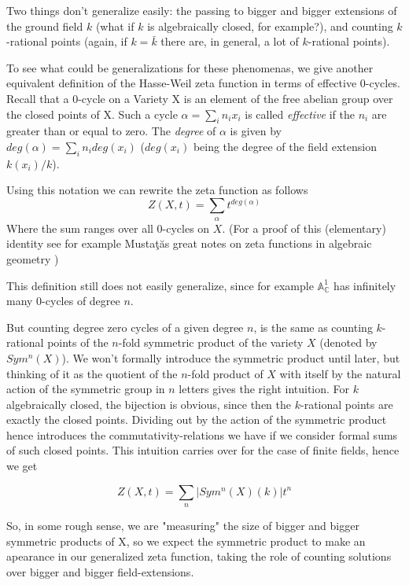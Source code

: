 \documentclass[11pt, a4paper, german]{article}
\theoremstyle{plain}
\theoremstyle{definition}
\begin{document}
Two things don't generalize easily: the passing to bigger and bigger extensions of the ground field $k$ (what if $k$ is algebraically closed,
for example?), and counting $k$-rational points (again, if $k = \bar{k}$ there are, in general, a lot of $k$-rational points). 

To see what could be generalizations for these phenomenas, 
we give another equivalent definition of the Hasse-Weil zeta function in terms of effective 0-cycles. 
Recall that a 0-cycle on a Variety X is an element of the free abelian group over the closed 
points of X. Such a cycle $\alpha = \sum_i n_i x_i$ is called \emph{effective} if the $n_i$ are greater than or equal to zero.
The \emph{degree} of $\alpha$ is given by $deg(\alpha) = \sum_i n_i deg(x_i)$ ($deg(x_i)$ being the degree of the field extension $k(x_i)/k$).

Using this notation we can rewrite the zeta function as follows 
\begin{equation}
    Z(X,t) = \sum_{\alpha} t^{deg(\alpha)}
\end{equation}
Where the sum ranges over all 0-cycles on $X$.
(For a proof of this (elementary) identity see for example Musta\c{t}\u{a}s great notes on zeta functions in algebraic geometry 
\cite[Remark 2.9]{mustata})

This definition still does not easily generalize, since for example $\mathbb{A}_{\mathbb{C}}^1$ has infinitely many 0-cycles of degree $n$.

But counting degree zero cycles of a given degree $n$, is the same as counting $k$-rational points of the $n$-fold symmetric product of the 
variety $X$ (denoted by $Sym^n(X)$).
We won't formally introduce the symmetric product until later, but thinking of it as the quotient of 
the $n$-fold product of $X$ with itself by the natural action of the symmetric group in $n$ letters gives the right intuition. 
For $k$ algebraically closed, the bijection is obvious, since then the $k$-rational points are exactly the closed points. 
Dividing out by the action of the symmetric product hence introduces the commutativity-relations we have if we consider formal sums
of such closed points. This intuition carries over for the case of finite fields, hence we get

\begin{equation}
    Z(X,t) = \sum_{n} |Sym^n(X)(k)| t^n
\end{equation}

So, in some rough sense, we are "measuring" the size of bigger and bigger symmetric products of X, so we expect the symmetric product
to make an apearance in our generalized zeta function, taking the role of counting solutions over bigger and bigger field-extensions.
\end{document}
